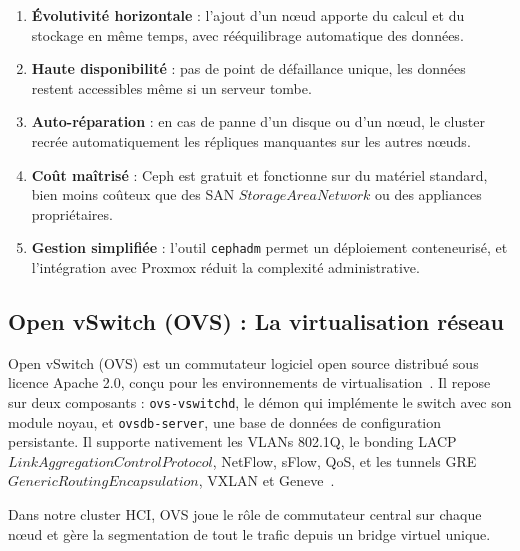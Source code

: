 \begin{enumerate}

    \item \textbf{Évolutivité horizontale} : l'ajout d'un n\oe{}ud apporte du calcul et du stockage en même temps, avec rééquilibrage automatique des données.

    \item \textbf{Haute disponibilité} : pas de point de défaillance unique, les données restent accessibles même si un serveur tombe.

    \item \textbf{Auto-réparation} : en cas de panne d'un disque ou d'un n\oe{}ud, le cluster recrée automatiquement les répliques manquantes sur les autres n\oe{}uds.

    \item \textbf{Coût maîtrisé} : Ceph est gratuit et fonctionne sur du matériel standard, bien moins coûteux que des SAN \(Storage Area Network\) ou des appliances propriétaires.

    \item \textbf{Gestion simplifiée} : l'outil \texttt{cephadm} permet un déploiement conteneurisé, et l'intégration avec Proxmox réduit la complexité administrative.

\end{enumerate}

\subsection{Open vSwitch (OVS) : La virtualisation réseau}


\par Open vSwitch (OVS) est un commutateur logiciel open source distribué sous licence Apache 2.0, conçu pour les environnements de virtualisation~\cite{ref8}. Il repose sur deux composants : \texttt{ovs-vswitchd}, le démon qui implémente le switch avec son module noyau, et \texttt{ovsdb-server}, une base de données de configuration persistante. Il supporte nativement les VLANs 802.1Q, le bonding LACP \(Link Aggregation Control Protocol\), NetFlow, sFlow, QoS, et les tunnels GRE \(Generic Routing Encapsulation\), VXLAN et Geneve~\cite{ref9}.\\

\par Dans notre cluster HCI, OVS joue le rôle de commutateur central sur chaque n\oe{}ud et gère la segmentation de tout le trafic depuis un bridge virtuel unique.\\

